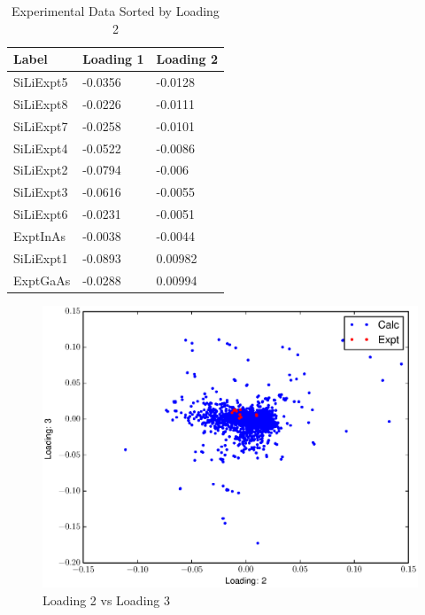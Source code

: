 \documentclass[12pt,letterpaper]{article}
\begin{document}
\begin{table}[h]
  \begin{center}
  \begin{tabular}{|l|l|l|}
    \hline
    \textbf{Label} & \textbf{Loading 1} & \textbf{Loading 2} \\ \hline
    SiLiExpt5      & -0.0356            & -0.0128            \\ \hline
    SiLiExpt8      & -0.0226            & -0.0111            \\ \hline
    SiLiExpt7      & -0.0258            & -0.0101            \\ \hline
    SiLiExpt4      & -0.0522            & -0.0086            \\ \hline
    SiLiExpt2      & -0.0794            & -0.006             \\ \hline
    SiLiExpt3      & -0.0616            & -0.0055            \\ \hline
    SiLiExpt6      & -0.0231            & -0.0051            \\ \hline
    ExptInAs       & -0.0038            & -0.0044            \\ \hline
    SiLiExpt1      & -0.0893            & 0.00982            \\ \hline
    ExptGaAs       & -0.0288            & 0.00994            \\ \hline
  \end{tabular}
  \caption{Experimental Data Sorted by Loading 2}
  \end{center}
\end{table}

\begin{figure}[ht]
  \begin{center}
    \includegraphics[scale=0.8]{figs/eigenspace2-3.eps}
    \caption{Loading 2 vs  Loading 3}
  \end{center}
\end{figure}
\end{document}
